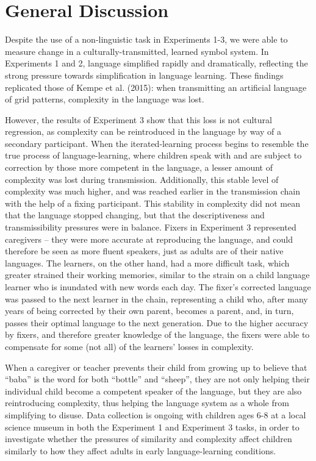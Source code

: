 \documentclass[10pt, letterpaper]{article}
\begin{document}
\section{General Discussion}\label{general-discussion}

Despite the use of a non-linguistic task in Experiments 1-3, we were
able to measure change in a culturally-transmitted, learned symbol
system. In Experiments 1 and 2, language simplified rapidly and
dramatically, reflecting the strong pressure towards simplification in
language learning. These findings replicated those of Kempe et al.
(2015): when transmitting an artificial language of grid patterns,
complexity in the language was lost.

However, the results of Experiment 3 show that this loss is not cultural
regression, as complexity can be reintroduced in the language by way of
a secondary participant. When the iterated-learning process begins to
resemble the true process of language-learning, where children speak
with and are subject to correction by those more competent in the
language, a lesser amount of complexity was lost during transmission.
Additionally, this stable level of complexity was much higher, and was
reached earlier in the transmission chain with the help of a fixing
participant. This stability in complexity did not mean that the language
stopped changing, but that the descriptiveness and transmissibility
pressures were in balance. Fixers in Experiment 3 represented caregivers
-- they were more accurate at reproducing the language, and could
therefore be seen as more fluent speakers, just as adults are of their
native languages. The learners, on the other hand, had a more difficult
task, which greater strained their working memories, similar to the
strain on a child language learner who is inundated with new words each
day. The fixer's corrected language was passed to the next learner in
the chain, representing a child who, after many years of being corrected
by their own parent, becomes a parent, and, in turn, passes their
optimal language to the next generation. Due to the higher accuracy by
fixers, and therefore greater knowledge of the language, the fixers were
able to compensate for some (not all) of the learners' losses in
complexity.

When a caregiver or teacher prevents their child from growing up to
believe that ``baba'' is the word for both ``bottle'' and ``sheep'',
they are not only helping their individual child become a competent
speaker of the language, but they are also reintroducing complexity,
thus helping the language system as a whole from simplifying to disuse.
Data collection is ongoing with children ages 6-8 at a local science
museum in both the Experiment 1 and Experiment 3 tasks, in order to
investigate whether the pressures of similarity and complexity affect
children similarly to how they affect adults in early language-learning
conditions.
\end{document}
